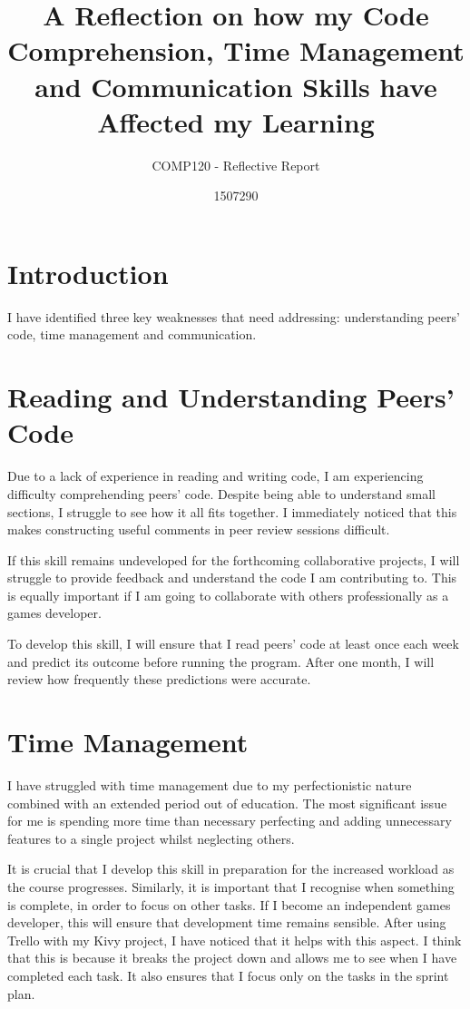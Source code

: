 \documentclass{scrartcl}
\title{A Reflection on how my Code Comprehension, Time Management and Communication Skills have Affected my Learning}
\subtitle{COMP120 - Reflective Report}
\author{1507290}
\begin{document}
\maketitle

\abstract{}

\section{Introduction}
I have identified three key weaknesses that need addressing: understanding peers' code, time management and communication.

\section{Reading and Understanding Peers' Code}
Due to a lack of experience in reading and writing code, I am experiencing difficulty comprehending peers' code. Despite being able to understand small sections, I struggle to see how it all fits together. I immediately noticed that this makes constructing useful comments in peer review sessions difficult.

If this skill remains undeveloped for the forthcoming collaborative projects, I will struggle to provide feedback and understand the code I am contributing to. This is equally important if I am going to collaborate with others professionally as a games developer.

To develop this skill, I will ensure that I read peers' code at least once each week and predict its outcome before running the program. After one month, I will review how frequently these predictions were accurate.

\section{Time Management}
I have struggled with time management due to my perfectionistic nature combined with an extended period out of education. The most significant issue for me is spending more time than necessary perfecting and adding unnecessary features to a single project whilst neglecting others.

It is crucial that I develop this skill in preparation for the increased workload as the course progresses. Similarly, it is important that I recognise when something is complete, in order to focus on other tasks. If I become an independent games developer, this will ensure that development time remains sensible. After using Trello with my Kivy project, I have noticed that it helps with this aspect. I think that this is because it breaks the project down and allows me to see when I have completed each task. It also ensures that I focus only on the tasks in the sprint plan.
\end{document}
